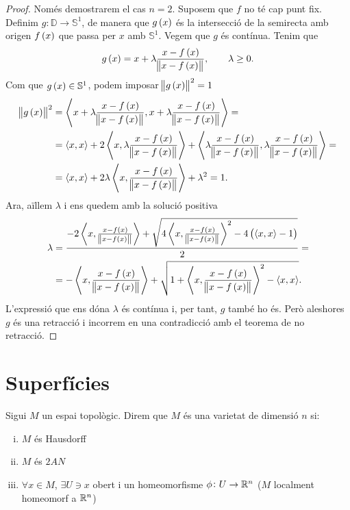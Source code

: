 \begin{proof}
	Només demostrarem el cas $n=2$. Suposem que $f$ no té cap punt fix. Definim $g\colon \mathbb{D} \to \mathbb{S}^1$, de manera que $g\left( x \right)$ és la intersecció de la semirecta amb origen $f\left( x \right)$ que passa per $x$ amb $\mathbb{S}^1$. Vegem que $g$ és contínua. Tenim que
	\[
		g\left( x \right) = x+\lambda\frac{x-f\left( x \right)}{\norm{x-f\left( x \right)}}, \qquad \lambda \geq 0.
	\]
	Com que $g\left( x\right) \in \mathbb{S}^1$, podem imposar $\norm{g\left( x \right)}^2 = 1$
	\begin{align*}
		\norm{g\left( x \right)}^2 &= \left< x+\lambda\frac{x-f\left( x \right)}{\norm{x-f\left( x \right)}}, x+\lambda\frac{x-f\left( x \right)}{\norm{x-f\left( x \right)}} \right> = \\
		&=  \left< x, x \right> + 2\left< x, \lambda\frac{x-f\left( x \right)}{\norm{x-f\left( x \right)}} \right> + \left<\lambda\frac{x-f\left( x \right)}{\norm{x-f\left( x \right)}}, \lambda\frac{x-f\left( x \right)}{\norm{x-f\left( x \right)}} \right> = \\
		&=  \left< x, x \right> + 2\lambda \left< x, \frac{x-f\left( x \right)}{\norm{x-f\left( x \right)}} \right> + \lambda ^2 = 1.
	\end{align*}
	Ara, aïllem $\lambda$ i ens quedem amb la solució positiva
	\begin{align*}
		\lambda &= \frac{-2\left< x, \frac{x-f\left( x \right)}{\norm{x-f\left( x \right)}} \right> + \sqrt{4\left< x, \frac{x-f\left( x \right)}{\norm{x-f\left( x \right)}} \right> ^2 -4\left( \left<x, x\right> -1 \right)}}{2} = \\
		&= -\left< x, \frac{x-f\left( x \right)}{\norm{x-f\left( x \right)}} \right> + \sqrt{1+\left< x, \frac{x-f\left( x \right)}{\norm{x-f\left( x \right)}} \right> ^2 -\left<x, x\right>}.
	\end{align*}
	L'expressió que ens dóna $\lambda$ és contínua i, per tant, $g$ també ho és. Però aleshores $g$ és una retracció i incorrem en una contradicció amb el teorema de no retracció.
\end{proof}

\section{Superfícies}

\begin{defi}[Varietat]
	Sigui $M$ un espai topològic. Direm que $M$ és una varietat de dimensió $n$ si:
	\begin{enumerate}[i)]
	\item $M$ és Hausdorff
	\item $M$ és $2AN$
	\item $\forall x \in M$, $\exists U \ni x$ obert i un homeomorfisme
		$\phi \colon U \to \mathbb{R}^n$ ($M$ localment homeomorf a $\mathbb{R}^n$)
\end{enumerate}
\end{defi}


